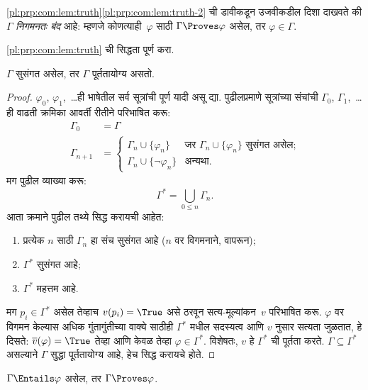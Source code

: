 \ref{pl:prp:com:lem:truth}\ref{pl:prp:com:lem:truth-2} ची डावीकडून उजवीकडील
दिशा दाखवते की $\Gamma$ \emph{निगमनतः बंद} आहे: म्हणजे
कोणत्याही~$\varphi$ साठी $\Gamma \Proves \varphi$ असेल, तर $\varphi
\in \Gamma$.

\begin{prob}
  \ref{pl:prp:com:lem:truth} ची सिद्धता पूर्ण करा.
\end{prob}

\begin{thm}[संपूर्णता]
\label{pl:prp:com:thm:completeness}
$\Gamma$ सुसंगत असेल, तर $\Gamma$ पूर्ततायोग्य असतो.
\end{thm}

\begin{proof}
$\varphi_0$, $\varphi_1$,~\dots ही भाषेतील सर्व सूत्रांची
पूर्ण यादी असू द्या. पुढीलप्रमाणे सूत्रांच्या संचांची
$\Gamma_0$, $\Gamma_1$,~\dots ही वाढती क्रमिका
आवर्ती रीतीने परिभाषित करू:
\begin{align*}
\Gamma_0 & = \Gamma\\
\Gamma_{n+1} &  =
\begin{cases}
  \Gamma_n \cup \{\varphi_n\} & \text{जर $\Gamma_n \cup \{\varphi_n\}$ सुसंगत असेल;}\\
  \Gamma_n \cup \{\lnot \varphi_n\} & \text{अन्यथा}.
\end{cases}
\end{align*}
मग पुढील व्याख्या करू:
\[
\Gamma^* = \bigcup_{0\le n}\Gamma_n.
\]
आता क्रमाने पुढील तथ्ये सिद्ध करायची आहेत:
\begin{enumerate}
\item प्रत्येक $n$ साठी $\Gamma_n$ हा संच सुसंगत आहे
  ($n$ वर विगमनाने,  वापरून);
\item $\Gamma^*$ सुसंगत आहे;
\item $\Gamma^*$ महत्तम आहे.
\end{enumerate}
मग $p_i \in \Gamma^*$ असेल तेव्हाच $v(p_i) = \True$
असे ठरवून सत्य-मूल्यांकन~$v$ परिभाषित करू. $\varphi$ वर विगमन
केल्यास अधिक गुंतागुंतीच्या वाक्ये साठीही
$\Gamma^*$ मधील सदस्यत्व आणि $v$ नुसार सत्यता जुळतात,
हे दिसते: $\overline{v}(\varphi) = \True$ तेव्हा आणि केवळ तेव्हा
$\varphi \in \Gamma^*$. विशेषतः, $v$ हे $\Gamma^*$ ची पूर्तता
करते. $\Gamma \subseteq \Gamma^*$ असल्याने $\Gamma$
सुद्धा पूर्ततायोग्य आहे, हेच सिद्ध करायचे होते.
\end{proof}

\begin{cor}
$\Gamma \Entails \varphi$ असेल, तर $\Gamma \Proves \varphi$.
\end{cor}

